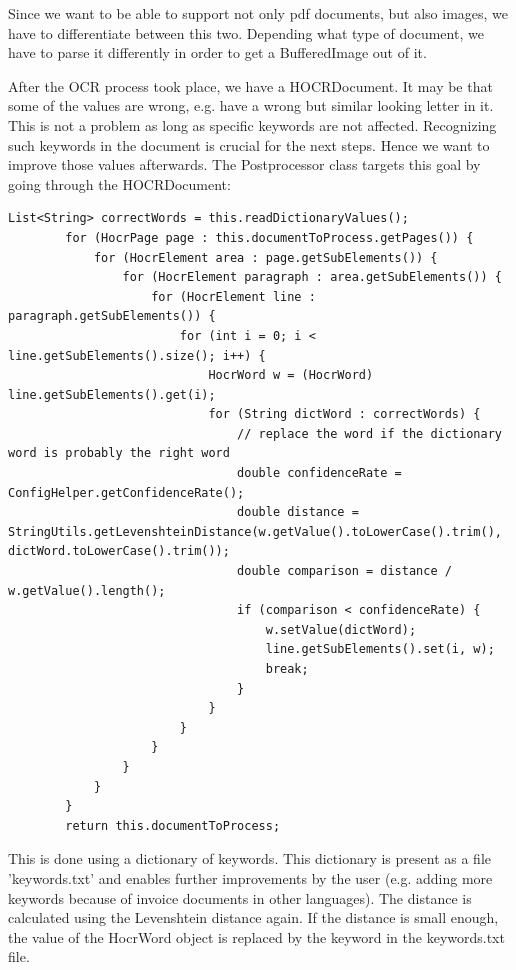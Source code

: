 Since we want to be able to support not only pdf documents, but also images, we have to differentiate between this two. Depending what type of document, we have to parse it differently in order to get a BufferedImage out of it.

After the OCR process took place, we have a HOCRDocument. It may be that some of the values are wrong, e.g. have a wrong but similar looking letter in it. This is not a problem as long as specific keywords are not affected. Recognizing such keywords in the document is crucial for the next steps. Hence we want to improve those values afterwards. 
The Postprocessor class targets this goal by going through the HOCRDocument:

\begin{lstlisting}[caption={Postprocessing the hocr document}]
        List<String> correctWords = this.readDictionaryValues();
        for (HocrPage page : this.documentToProcess.getPages()) {
            for (HocrElement area : page.getSubElements()) {
                for (HocrElement paragraph : area.getSubElements()) {
                    for (HocrElement line : paragraph.getSubElements()) {
                        for (int i = 0; i < line.getSubElements().size(); i++) {
                            HocrWord w = (HocrWord) line.getSubElements().get(i);
                            for (String dictWord : correctWords) {
                                // replace the word if the dictionary word is probably the right word
                                double confidenceRate = ConfigHelper.getConfidenceRate();
                                double distance = StringUtils.getLevenshteinDistance(w.getValue().toLowerCase().trim(), dictWord.toLowerCase().trim());
                                double comparison = distance / w.getValue().length();
                                if (comparison < confidenceRate) {
                                    w.setValue(dictWord);
                                    line.getSubElements().set(i, w);
                                    break;
                                }
                            }
                        }
                    }
                }
            }
        }
        return this.documentToProcess;
\end{lstlisting}

This is done using a dictionary of keywords. This dictionary is present as a file 'keywords.txt' and enables further improvements by the user (e.g. adding more keywords because of invoice documents in other languages).
The distance is calculated using the Levenshtein distance again. If the distance is small enough, the value of the HocrWord object is replaced by the keyword in the keywords.txt file.

